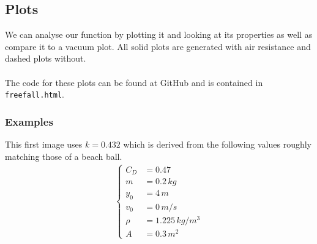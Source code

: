 \documentclass[%
aip,
jmp,
amsmath,amssymb,
reprint,%
]{revtex4-1}
\begin{document}
	\subsection{Plots}\label{seq:airResPlots}
	We can analyse our function by plotting it and looking at its properties as well as compare it to a vacuum plot. All solid plots are generated with air resistance and dashed plots without.
	\\~\\
	The code for these plots can be found at GitHub\cite{code} and is contained in \texttt{freefall.html}.
	\subsubsection{Examples}
	This first image uses $k = 0.432$ which is derived from the following values roughly matching those of a beach ball.
	\begin{align}
		\begin{cases}\nonumber
			C_D &= 0.47 \\
			m &= 0.2\,kg\\
			y_0 &= 4\,m\\
			v_0 &= 0\,m/s\\
			\rho &= 1.225\,kg/m^3\\
			A &= 0.3\,m^2
		\end{cases}
	\end{align}
\end{document}
